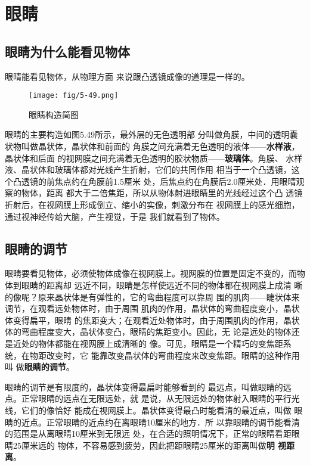 \section{眼睛}
\subsection{眼睛为什么能看见物体}

眼晴能看见物体，从物理方面
来说跟凸透镜成像的道理是一样的。
\begin{figure}[htp]\centering
    \texttt{[image: fig/5-49.png]}
    \caption{眼睛构造简图}
    \end{figure}

眼睛的主要构造如图5.49所示，最外层的无色透明部
分叫做角膜，中间的透明囊状物叫做晶状体，晶状体和前面的
角膜之间充满着无色透明的液体——\textbf{水样液}，晶状体和后面
的视网膜之间充满着无色透明的胶状物质——\textbf{玻璃体}。角膜、
水样液、晶状体和玻璃体都对光线产生折射，它们的共同作用
相当于一个凸透镜，这个凸透镜的前焦点约在角膜前1.5厘米
处，后焦点约在角膜后2.0厘米处．用眼晴观察的物体，距离
都大于二倍焦距，所以从物体射进眼睛里的光线经过这个凸
透镜折射后，在视网膜上形成倒立、缩小的实像，刺激分布在
视网膜上的感光细胞，通过视神经传给大脑，产生视觉，于是
我们就看到了物体。

\subsection{眼睛的调节}

眼睛要看见物体，必须使物体成像在视网膜上。视网膜的位置是固定不变的，而物体到眼睛的距离却
远近不同，眼睛是怎样使远近不同的物体都在视网膜上成清
晰的像呢？原来晶状体是有弹性的，它的弯曲程度可以靠周
围的肌肉——睫状体来调节，在观看远处物体时，由于周围
肌肉的作用，晶状体的弯曲程度变小，晶状体变得扁平，眼睛
的焦距变大；在观看近处物体时，由于周围肌肉的作用，晶状
体的弯曲程度变大，晶状体变凸，眼睛的焦距变小。因此，无
论是远处的物体还是近处的物体都能在视网膜上成清晰的
像。可见，眼睛是一个精巧的变焦距系统，在物距改变时，它
能靠改变晶状体的弯曲程度来改变焦距。眼睛的这种作用叫
做\textbf{眼睛的调节}。

眼睛的调节是有限度的，晶状体变得最扁时能够看到的
最远点，叫做眼睛的远点。正常眼睛的远点在无限远处，就
是说，从无限远处的物体射入眼睛的平行光线，它们的像恰好
能成在视网膜上。晶状体变得最凸时能看清的最近点，叫做
眼睛的近点。正常眼睛的近点约在离眼睛10厘米的地方．所
以靠眼睛的调节能看清的范围是从离眼睛10厘米到无限远
处，在合适的照明情况下，正常的眼睛看距眼睛25厘米远的
物体，不容易感到疲劳，因此把距眼睛25厘米的距离叫做\textbf{明
视距离}。

